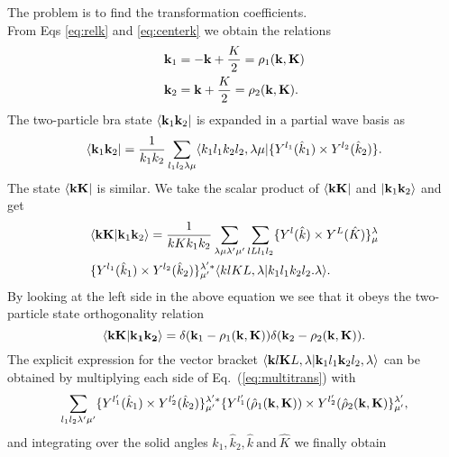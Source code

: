The problem is to find the transformation
coefficients.\\
From Eqs \eqref{eq:relk} and \eqref{eq:centerk} we obtain the relations
\begin{equation*}
		\begin{split}
				&\bold k_1=-\bold k +\frac{K}{2}=\bold \rho_1(\bold k,\bold K)\\
				& \bold k_2=\bold k + \frac{K}{2}=\bold \rho_2(\bold k,\bold K).
		\end{split}
\end{equation*}
The two-particle bra state $\langle \bold k_1 \bold k_2|$ is expanded in a partial wave basis as
\begin{equation*}
		\langle \bold k_1 \bold k_2|=\frac{1}{k_1k_2}\sum_{l_1l_2\lambda \mu}\langle k_1l_1k_2l_2,\lambda \mu|\{Y^{l_1}(\hat k_1)\times Y^{l_2}(\hat k_2) \}.
\end{equation*}
The state $\langle \bold k \bold K|$ is similar. We take the scalar product of $\langle \bold k \bold K|$ and $|\bold k_1 \bold k_2\rangle$ and get
\begin{equation}
		\begin{split}
				&\braket{\bold k \bold K}{\bold k_1 \bold k_2}=\frac{1}{kKk_1k_2}\sum_{\lambda \mu \lambda' \mu'}\sum_{lLl_1l_2}\{Y^l(\hat k)\times Y^L(\hat K)\}^\lambda_\mu\\
				&\{Y^{l_1}(\hat k_1)\times Y^{l_2}(\hat k_2) \}^{\lambda'*}_{\mu'}\braket{klKL,\lambda}{k_1l_1k_2l_2.\lambda}.
		\end{split}
		\label{eq:multitrans}
\end{equation}
By looking at the left side in the above equation we see that it obeys the two-particle state orthogonality relation 
\begin{equation*}
		\langle \bold k \bold K|\bold{k_1 k_2}\rangle=\delta(\bold k_1-\rho_1(\bold k,\bold K))\delta(\bold k_2-\rho_2(\bold k,\bold K)).
\end{equation*}
The explicit expression for the vector bracket $\langle \bold k l \bold K L,\lambda|\bold k_1 l_1 \bold k_2 l_2, \lambda\rangle$ can be obtained by multiplying each side of Eq.~(\eqref{eq:multitrans}) 
with
\begin{equation*}
		\sum_{l_1l_2\lambda'\mu'}\{Y^{l_1'}(\hat k_1)\times Y^{l_2'}(\hat k_2) \}^{\lambda'*}_{\mu'}\{Y^{l_1'}(\hat\rho_1(\bold k,\bold K))\times Y^{l_2'}(\hat \rho_2(\bold k,\bold K) \}^{\lambda'}_{\mu'},
\end{equation*}
and integrating over the solid angles $\hat k_1, \hat k_2,\hat k~ \mbox{and} ~\hat K$ we finally obtain
